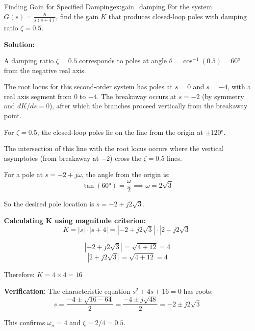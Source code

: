 \begin{example}{Finding Gain for Specified Damping}{ex:gain_damping}
For the system $G(s) = \frac{K}{s(s+4)}$, find the gain $K$ that produces closed-loop poles with damping ratio $\zeta = 0.5$.

\textbf{Solution:}

A damping ratio $\zeta = 0.5$ corresponds to poles at angle $\theta = \cos^{-1}(0.5) = 60°$ from the negative real axis.

The root locus for this second-order system has poles at $s = 0$ and $s = -4$, with a real axis segment from 0 to $-4$. The breakaway occurs at $s = -2$ (by symmetry and $dK/ds = 0$), after which the branches proceed vertically from the breakaway point.

For $\zeta = 0.5$, the closed-loop poles lie on the line from the origin at $\pm 120°$.

The intersection of this line with the root locus occurs where the vertical asymptotes (from breakaway at $-2$) cross the $\zeta = 0.5$ lines.

For a pole at $s = -2 + j\omega$, the angle from the origin is:
\[
\tan(60°) = \frac{\omega}{2} \implies \omega = 2\sqrt{3}
\]

So the desired pole location is $s = -2 + j2\sqrt{3}$.

\textbf{Calculating K using magnitude criterion:}
\[
K = |s| \cdot |s + 4| = |-2 + j2\sqrt{3}| \cdot |2 + j2\sqrt{3}|
\]

\[
|{-2 + j2\sqrt{3}}| = \sqrt{4 + 12} = 4
\]
\[
|2 + j2\sqrt{3}| = \sqrt{4 + 12} = 4
\]

Therefore: $K = 4 \times 4 = 16$

\textbf{Verification:} The characteristic equation $s^2 + 4s + 16 = 0$ has roots:
\[
s = \frac{-4 \pm \sqrt{16 - 64}}{2} = \frac{-4 \pm j\sqrt{48}}{2} = -2 \pm j2\sqrt{3}
\]

This confirms $\omega_n = 4$ and $\zeta = 2/4 = 0.5$. \checkmark
\end{example}

